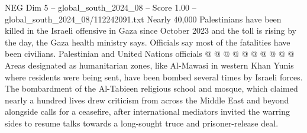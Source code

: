 \begin{textsample}{NEG Dim 5 – global\_south\_2024\_08 – Score 1.00 – global\_south\_2024\_08/112242091.txt}
Nearly 40,000 Palestinians have been killed in the Israeli offensive in Gaza since October 2023 and the toll is rising by the day, the Gaza health ministry says.
Officials say most of the fatalities have been civilians.
Palestinian and United Nations officials @ @ @ @ @ @ @ @ @ @ Areas designated as humanitarian zones, like Al-Mawasi in western Khan Yunis where residents were being sent, have been bombed several times by Israeli forces.
The bombardment of the Al-Tabieen religious school and mosque, which claimed nearly a hundred lives drew criticism from across the Middle East and beyond alongside calls for a ceasefire, after international mediators invited the warring sides to resume talks towards a long-sought truce and prisoner-release deal.

\end{textsample}
